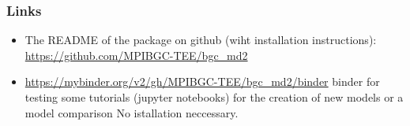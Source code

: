 \documentclass[unknownkeysallowed,usepdftitle=false]{beamer}
\newcommand{\secvariable}{nothing}
\newcommand{\mysection}[1]{\renewcommand{\secvariable}{#1}
}
\begin{document}
\mysection{Links}\label{links}
\begin{frame}
	\frametitle{Links}
  \begin{itemize}
    \item
      The README of the package on github (wiht installation instructions):
      \url{https://github.com/MPIBGC-TEE/bgc_md2}
    \item
      \url{https://mybinder.org/v2/gh/MPIBGC-TEE/bgc_md2/binder}
      binder for testing some 
      tutorials (jupyter notebooks) for the creation of new models or a model comparison
      No istallation neccessary.
  \end{itemize}
\end{frame}
\end{document}
